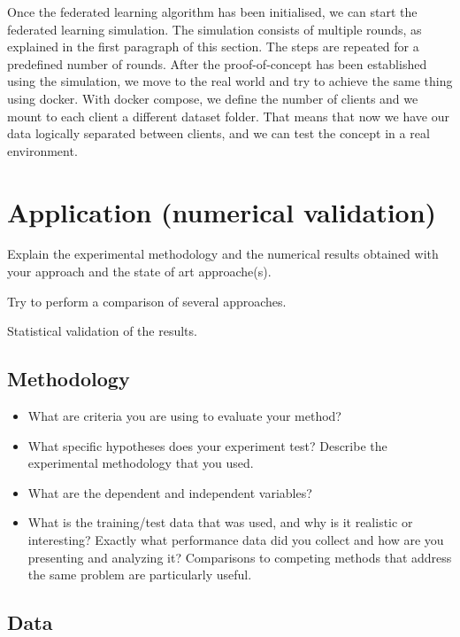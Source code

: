 \documentclass[runningheads,a4paper,11pt]{report}
\begin{document}
Once the federated learning algorithm has been initialised, we can start the federated learning simulation. The simulation consists of multiple rounds, as explained in the first paragraph of this section. The steps are repeated for a predefined number of rounds. After the proof-of-concept has been established using the simulation, we move to the real world and try to achieve the same thing using docker. With docker compose, we define the number of clients and we mount to each client a different dataset folder. That means that now we have our data logically separated between clients, and we can test the concept in a real environment.


\chapter{Application (numerical validation)}
\label{chapter:application}


Explain the experimental methodology and the numerical results obtained with your approach and the state of art approache(s).

Try to perform a comparison of several approaches.

Statistical validation of the results.


\section{Methodology}
\label{section:methodology}

\begin{itemize}
	\item What are criteria you are using to evaluate your method? 
	\item What specific hypotheses does your experiment test? Describe the experimental methodology that you used. 
	\item What are the dependent and independent variables? 
	\item What is the training/test data that was used, and why is it realistic or interesting? Exactly what performance data did you collect and how are you presenting and analyzing it? Comparisons to competing methods that address the same problem are particularly useful.
\end{itemize}

\section{Data}
\label{section:data}
\end{document}
